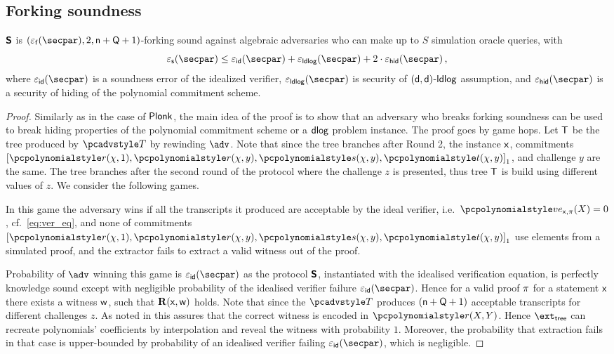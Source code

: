 \documentclass[runningheads,11pt]{llncs}
\begin{document}
\subsection{Forking soundness}
\begin{lemma}
	\label{lem:sonicprot_ss}
  $\bm{\mathsf{S}}$ is $(\epsss(\secpar), 2, \multconstr + \linconstr + 1)$-forking sound against
  algebraic adversaries who can make up to $S$ simulation oracle queries, with
  \[
			\epss(\secpar) \leq \epsid(\secpar) + \epsldlog(\secpar) + 2\cdot \epsh(\secpar)\,,
	\]
	where $\epsid(\secpar)$ is a soundness error of the idealized verifier, $\epsldlog(\secpar)$ is
  security of $(\mathsf{d}, \mathsf{d})$-$\mathsf{ldlog}$ assumption, and $\epsh (\secpar)$ is
  a security of hiding of the polynomial commitment scheme.
\end{lemma}
\begin{proof}
  Similarly as in the case of $\textnormal{\textsf{Plonk}}$, the main idea of the proof is to show
  that an adversary who breaks forking soundness can be used to break hiding
  properties of the polynomial commitment scheme or a $\mathsf{dlog}$ problem
  instance. The proof goes by game hops. Let $\mathsf{T}$ be the tree produced by
  $\tdv$ by rewinding $\adv$. Note that since the tree branches after Round 2,
  the instance $\mathsf{x}$, commitments
  $\gone{\p{r} (\chi, 1), \p{r} (\chi, y), \p{s} (\chi, y), \p{t} (\chi, y)}$, and challenge
  $y$ are the same. The tree branches after the second round
  of the protocol where the challenge $z$ is presented, thus tree $\mathsf{T}$ is
  build using different values of $z$.
%
  We consider the following games.

   In this game the adversary wins if all the transcripts it
  produced are acceptable by the ideal verifier,
  i.e.~$\vereq_{\inp, \zkproof}(X) = 0$, cf.~\cref{eq:ver_eq}, and none of
  commitments
  $\gone{\p{r} (\chi, 1), \p{r} (\chi, y), \p{s} (\chi, y), \p{t} (\chi, y)}$ use
    elements from a simulated proof, and the extractor fails to extract a valid
    witness out of the proof.

     Probability of
    $\adv$ winning this game is $\epsid(\secpar)$ as the protocol $\bm{\mathsf{S}}$,
    instantiated with the idealised verification equation, is perfectly
    knowledge sound except with negligible probability of the idealised verifier
    failure $\epsid(\secpar)$. Hence for a valid proof $\pi$ for a
    statement $\mathsf{x}$ there exists a witness $\mathsf{w}$, such that $\mathbf{R}(\mathsf{x}, \mathsf{w})$
    holds. Note that since the $\tdv$ produces $(\mathsf{n} + \mathsf{Q} + 1)$
    acceptable transcripts for different challenges $z$. As noted in
    \cite{CCS:MBKM19} this assures that the correct witness is encoded in
    $\p{r} (X, Y)$. Hence $\extt$ can recreate polynomials' coefficients by
    interpolation and reveal the witness with probability $1$. Moreover, the
    probability that extraction fails in that case is upper-bounded by
    probability of an idealised verifier failing $\epsid(\secpar)$, which is
    negligible.


\end{proof}
\end{document}
